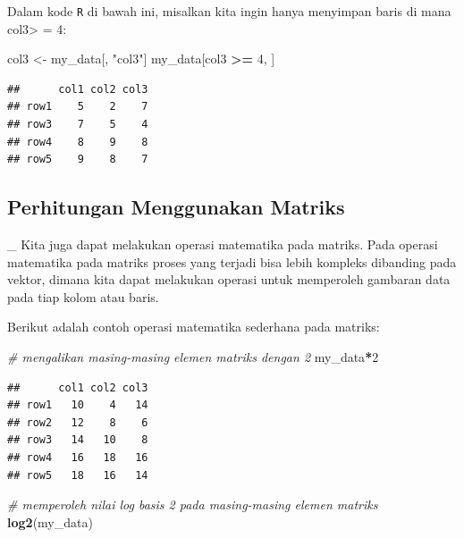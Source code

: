 \documentclass[
]{book}
\newenvironment{Shaded}{\begin{snugshade}}{\end{snugshade}}
\newcommand{\CommentTok}[1]{\textcolor[rgb]{0.56,0.35,0.01}{\textit{#1}}}
\newcommand{\DecValTok}[1]{\textcolor[rgb]{0.00,0.00,0.81}{#1}}
\newcommand{\FunctionTok}[1]{\textcolor[rgb]{0.13,0.29,0.53}{\textbf{#1}}}
\newcommand{\NormalTok}[1]{#1}
\newcommand{\OtherTok}[1]{\textcolor[rgb]{0.56,0.35,0.01}{#1}}
\newcommand{\SpecialCharTok}[1]{\textcolor[rgb]{0.81,0.36,0.00}{\textbf{#1}}}
\newcommand{\StringTok}[1]{\textcolor[rgb]{0.31,0.60,0.02}{#1}}
\theoremstyle{definition}
\theoremstyle{definition}
\theoremstyle{definition}
\theoremstyle{definition}
\theoremstyle{remark}
\begin{document}
Dalam kode \texttt{R} di bawah ini, misalkan kita ingin hanya menyimpan baris di mana col3\textgreater{} = 4:

\begin{Shaded}
\begin{Highlighting}[]
\NormalTok{col3 }\OtherTok{\textless{}{-}}\NormalTok{ my\_data[, }\StringTok{"col3"}\NormalTok{]}
\NormalTok{my\_data[col3 }\SpecialCharTok{\textgreater{}=} \DecValTok{4}\NormalTok{, ]}
\end{Highlighting}
\end{Shaded}

\begin{verbatim}
##      col1 col2 col3
## row1    5    2    7
## row3    7    5    4
## row4    8    9    8
## row5    9    8    7
\end{verbatim}

\hypertarget{matrixcalculation}{%
\subsection{Perhitungan Menggunakan Matriks}\label{matrixcalculation}}

\_
Kita juga dapat melakukan operasi matematika pada matriks. Pada operasi matematika pada matriks proses yang terjadi bisa lebih kompleks dibanding pada vektor, dimana kita dapat melakukan operasi untuk memperoleh gambaran data pada tiap kolom atau baris.

Berikut adalah contoh operasi matematika sederhana pada matriks:

\begin{Shaded}
\begin{Highlighting}[]
\CommentTok{\# mengalikan masing{-}masing elemen matriks dengan 2}
\NormalTok{my\_data}\SpecialCharTok{*}\DecValTok{2}
\end{Highlighting}
\end{Shaded}

\begin{verbatim}
##      col1 col2 col3
## row1   10    4   14
## row2   12    8    6
## row3   14   10    8
## row4   16   18   16
## row5   18   16   14
\end{verbatim}

\begin{Shaded}
\begin{Highlighting}[]
\CommentTok{\# memperoleh nilai log basis 2 pada masing{-}masing elemen matriks}
\FunctionTok{log2}\NormalTok{(my\_data)}
\end{Highlighting}
\end{Shaded}
\end{document}
